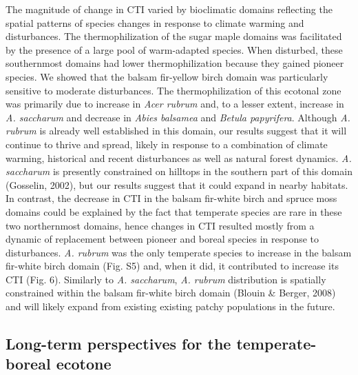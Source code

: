 \documentclass[
  a4paperpaper,
]{article}
\begin{document}
The magnitude of change in CTI varied by bioclimatic domains reflecting
the spatial patterns of species changes in response to climate warming
and disturbances. The thermophilization of the sugar maple domains was
facilitated by the presence of a large pool of warm-adapted species.
When disturbed, these southernmost domains had lower thermophilization
because they gained pioneer species. We showed that the balsam
fir-yellow birch domain was particularly sensitive to moderate
disturbances. The thermophilization of this ecotonal zone was primarily
due to increase in \emph{Acer rubrum} and, to a lesser extent, increase
in \emph{A. saccharum} and decrease in \emph{Abies balsamea} and
\emph{Betula papyrifera}. Although \emph{A. rubrum} is already well
established in this domain, our results suggest that it will continue to
thrive and spread, likely in response to a combination of climate
warming, historical and recent disturbances as well as natural forest
dynamics. \emph{A. saccharum} is presently constrained on hilltops in
the southern part of this domain (Gosselin, 2002), but our results
suggest that it could expand in nearby habitats. In contrast, the
decrease in CTI in the balsam fir-white birch and spruce moss domains
could be explained by the fact that temperate species are rare in these
two northernmost domains, hence changes in CTI resulted mostly from a
dynamic of replacement between pioneer and boreal species in response to
disturbances. \emph{A. rubrum} was the only temperate species to
increase in the balsam fir-white birch domain (Fig. S5) and, when it
did, it contributed to increase its CTI (Fig. 6). Similarly to \emph{A.
saccharum}, \emph{A. rubrum} distribution is spatially constrained
within the balsam fir-white birch domain (Blouin \& Berger, 2008) and
will likely expand from existing existing patchy populations in the
future.

\hypertarget{long-term-perspectives-for-the-temperate-boreal-ecotone}{%
\subsection{Long-term perspectives for the temperate-boreal
ecotone}\label{long-term-perspectives-for-the-temperate-boreal-ecotone}}
\end{document}
